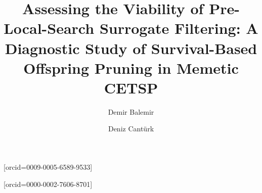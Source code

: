\documentclass[a4paper,fleqn]{cas-dc}
\renewcommand{\textfraction}{0.07} %
\renewcommand{\floatpagefraction}{0.7}  %
\begin{document}
\let\WriteBookmarks\relax
\def\floatpagepagefraction{1}
\def\textpagefraction{.001}


\title[mode=title]{Assessing the Viability of Pre-Local-Search Surrogate Filtering:
A Diagnostic Study of Survival-Based Offspring Pruning in Memetic CETSP}

\author[1]{Demir Balemir}[orcid=0009-0005-6589-9533]
\cormark[1]

\author[1]{Deniz Cant{\"u}rk}[orcid=0000-0002-7606-8701]


\end{document}
